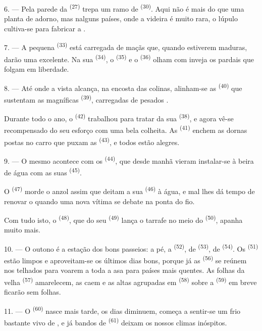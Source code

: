 \VUsaut{6.0mm}
\VUsaut{3.4mm}

6. --- Pela parede da  \textsuperscript{(27)} trepa um ramo de
 \textsuperscript{(30)}. Aqui não é mais do que uma planta de
adorno, mas nalguns países, onde a videira é muito rara, o lúpulo
cultiva-se para fabricar a .

7. --- A pequena  \textsuperscript{(33)} está carregada de maçãs
que, quando estiverem maduras, darão uma  excelente. Na sua
 \textsuperscript{(34)}, o  \textsuperscript{(35)} e o
 \textsuperscript{(36)} olham com inveja os pardais que
folgam em liberdade.

8. --- Até onde a vista alcança, na encosta das colinas, alinham-se as
 \textsuperscript{(40)} que sustentam as magníficas 
\textsuperscript{(39)}, carregadas de pesados .

Durante todo o ano, o  \textsuperscript{(42)} trabalhou para
tratar da sua  \textsuperscript{(38)}, e agora vê-se recompensado do
seu esforço com uma bela colheita. As 
\textsuperscript{(41)} enchem as dornas postas no carro que puxam as
 \textsuperscript{(43)}, e todos estão alegres.

\VUsaut{5.0mm}
\VUsaut{3.4mm}

9. --- O mesmo acontece com os 
\textsuperscript{(44)}, que desde manhã vieram instalar-se à beira de água com
as suas  \textsuperscript{(45)}.

O  \textsuperscript{(47)} morde o anzol assim que deitam a sua
 \textsuperscript{(46)} à água, e mal lhes dá tempo de renovar o
 quando uma nova vítima se debate na ponta do fio.

Com tudo isto, o  \textsuperscript{(48)}, que do seu
 \textsuperscript{(49)} lança o tarrafe no meio do 
\textsuperscript{(50)}, apanha muito mais.

10. --- O outono é a estação dos bons passeios: a pé, a 
\textsuperscript{(52)}, de  \textsuperscript{(53)}, de
 \textsuperscript{(54)}. Os  \textsuperscript{(51)}
estão limpos e aproveitam-se os últimos dias bons, porque já as
 \textsuperscript{(56)} se reúnem nos telhados para voarem a
toda a asa para países mais quentes. As folhas da velha 
\textsuperscript{(57)} amarelecem, as  caem e as altas
 agrupadas em  \textsuperscript{(58)} sobre a
 \textsuperscript{(59)} em breve ficarão sem folhas.

11. --- O  \textsuperscript{(60)} nasce mais tarde, os dias diminuem,
começa a sentir-se um frio bastante vivo de , e já bandos
de  \textsuperscript{(61)} deixam os nossos climas
inóspitos.
\VUsaut{6.0mm}
\VUfilet{22mm}
